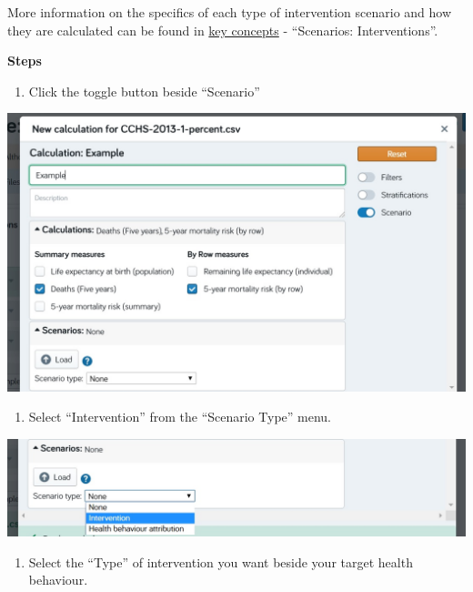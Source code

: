 \documentclass[]{book}
\providecommand{\tightlist}{%
  \setlength{\itemsep}{0pt}\setlength{\parskip}{0pt}}
\begin{document}
More information on the specifics of each type of intervention scenario
and how they are calculated can be found in
\protect\hyperlink{keyconcepts}{key concepts} - ``Scenarios:
Interventions''.

\textbf{Steps}

\begin{enumerate}
\def\labelenumi{\arabic{enumi}.}
\tightlist
\item
  Click the toggle button beside ``Scenario''
\end{enumerate}

\begin{center}\includegraphics{Images/Scenario} \end{center}

\begin{enumerate}
\def\labelenumi{\arabic{enumi}.}
\setcounter{enumi}{1}
\tightlist
\item
  Select ``Intervention'' from the ``Scenario Type'' menu.
\end{enumerate}

\begin{center}\includegraphics{Images/Scenario-Intervention} \end{center}

\begin{enumerate}
\def\labelenumi{\arabic{enumi}.}
\setcounter{enumi}{2}
\tightlist
\item
  Select the ``Type'' of intervention you want beside your target health
  behaviour.
\end{enumerate}
\end{document}
